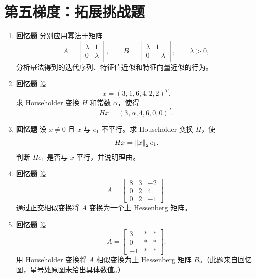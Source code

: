 \documentclass{article}
\newcommand{\oldtag}{\textcolor{red!65!black}{\textbf{回忆题}}}
\begin{document}
\section{第五梯度：拓展挑战题}

\begin{enumerate}
  \item \oldtag{} 分别应用幂法于矩阵
  \[
    A=\begin{bmatrix}\lambda&1\\0&\lambda\end{bmatrix},\qquad
    B=\begin{bmatrix}\lambda&1\\0&-\lambda\end{bmatrix},\qquad \lambda>0,
  \]
  分析幂法得到的迭代序列、特征值近似和特征向量近似的行为。

  \item \oldtag{} 设
  \[
    x=(3,1,6,4,2,2)^T.
  \]
  求 Householder 变换 $H$ 和常数 $\alpha$，使得
  \[
    Hx=(3,\alpha,4,6,0,0)^T.
  \]

  \item \oldtag{} 设 $x\ne0$ 且 $x$ 与 $e_1$ 不平行。求 Householder 变换 $H$，使
  \[
    Hx=\left\| x \right\|_2e_1.
  \]
  判断 $He_1$ 是否与 $x$ 平行，并说明理由。

  \item \oldtag{} 设
  \[
    A=\begin{bmatrix}8&3&-2\\0&2&4\\0&2&-1\end{bmatrix}.
  \]
  通过正交相似变换将 $A$ 变换为一个上 Hessenberg 矩阵。

  \item \oldtag{} 设
  \[
    A=\begin{bmatrix}3&*&*\\0&*&*\\-1&*&*\end{bmatrix}.
  \]
  用 Householder 变换将 $A$ 相似变换为上 Hessenberg 矩阵 $B$。（此题来自回忆图，星号处原图未给出具体数值。）


\end{enumerate}
\end{document}
